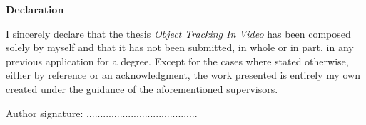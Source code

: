 \thispagestyle{plain}

\mbox{}
\vfill

\large
\textbf{Declaration}
\vspace*{1cm}

\normalsize
I sincerely declare that the thesis \textit{Object Tracking In Video} has been composed solely by myself and that it has not been submitted, in whole or in part, in any previous application for a degree. Except for the cases where stated otherwise, either by reference or an acknowledgment, the work presented is entirely my own created under the guidance of the aforementioned supervisors.

\vspace*{1.2cm}

\begin{flushright}
Author signature: \hspace*{1.5cm} ........................................
\end{flushright}